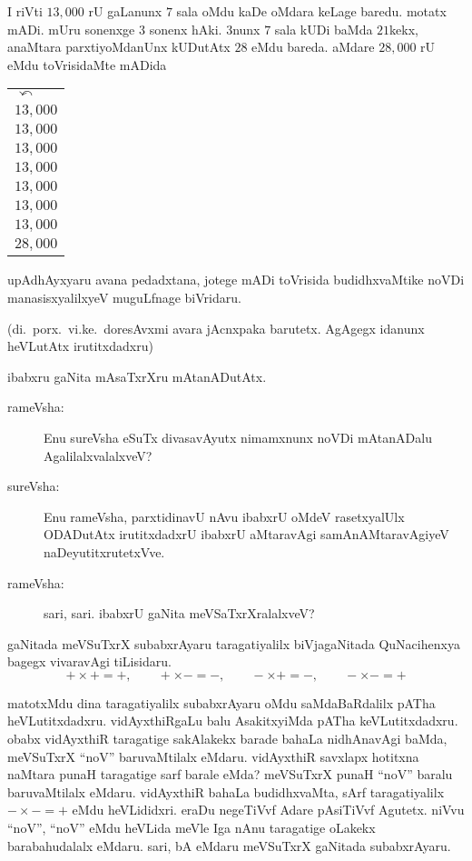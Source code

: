 \noindent
\begin{minipage}[c]{5.5cm}
\qquad I riVti $13,000$ rU gaLanunx $7$ sala oMdu kaDe oMdara keLage baredu. motatx mADi. mUru sonenxge $3$ sonenx hAki. $3$nunx $7$ sala kUDi baMda $21$kekx, anaMtara parxtiyoMdanUnx kUDutAtx $28$ eMdu bareda. aMdare $28,000$ rU eMdu toVrisidaMte mADida
\end{minipage}
\quad
\begin{minipage}[c]{4cm}
\begin{center}
\begin{tabular}{l}
$\curvearrowleft$\\
$13,000$\\
$13,000$\\
$13,000$\\
$13,000$\\
$13,000$\\
$13,000$\\
$13,000$\\
\hline
$28,000$
\end{tabular}
\end{center}
\end{minipage}

\smallskip

upAdhAyxyaru avana pedadxtana, jotege mADi toVrisida budidhxvaMtike noVDi manasisxyalilxyeV muguLfnage biVridaru.

(di.\ porx.\ vi.ke.\ doresAvxmi avara jAcnxpaka barutetx. AgAgegx idanunx heVLutAtx irutitxdadxru)

\medskip

ibabxru gaNita mAsaTxrXru mAtanADutAtx.
\begin{description}
\item[rameVsha:] Enu sureVsha eSuTx divasavAyutx nimamxnunx noVDi mAtanADalu AgalilalxvalalxveV?

\item[sureVsha:] Enu rameVsha, parxtidinavU nAvu ibabxrU oMdeV rasetxyalUlx ODADutAtx irutitxdadxrU ibabxrU aMtaravAgi samAnAMtaravAgiyeV naDeyutitxrutetxVve.

\item[rameVsha:] sari, sari. ibabxrU gaNita meVSaTxrXralalxveV?
\end{description}

\medskip
gaNitada meVSuTxrX subabxrAyaru taragatiyalilx biVjagaNitada QuNacihenxya bagegx vivaravAgi tiLisidaru.
$$
+\times+=+,\qquad +\times-=-,\qquad -\times+=-,\qquad -\times -=+
$$

matotxMdu dina taragatiyalilx subabxrAyaru oMdu saMdaBaRdalilx pATha heVLutitxdadxru. vidAyxthiRgaLu balu AsakitxyiMda pATha keVLutitxdadxru. obabx vidAyxthiR taragatige sakAlakekx barade bahaLa nidhAnavAgi baMda, meVSuTxrX ``noV'' baruvaMtilalx eMdaru. vidAyxthiR savxlapx hotitxna naMtara punaH taragatige sarf barale eMda? meVSuTxrX punaH ``noV'' baralu baruvaMtilalx eMdaru. vidAyxthiR bahaLa budidhxvaMta, sArf taragatiyalilx $-\times-=+$ eMdu heVLididxri. eraDu negeTiVvf Adare pAsiTiVvf Agutetx. niVvu ``noV'', ``noV'' eMdu heVLida meVle Iga nAnu taragatige oLakekx barabahudalalx eMdaru. sari, bA eMdaru meVSuTxrX gaNitada subabxrAyaru.

